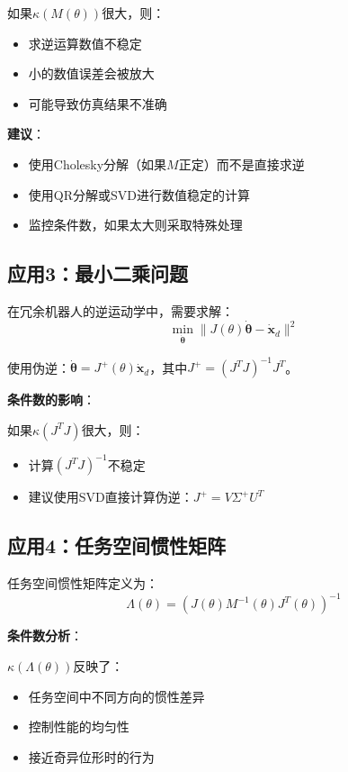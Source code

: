\documentclass[12pt,a4paper]{article}
\begin{document}
如果$\kappa(M(\theta))$很大，则：
\begin{itemize}
\item 求逆运算数值不稳定
\item 小的数值误差会被放大
\item 可能导致仿真结果不准确
\end{itemize}

\textbf{建议}：
\begin{itemize}
\item 使用Cholesky分解（如果$M$正定）而不是直接求逆
\item 使用QR分解或SVD进行数值稳定的计算
\item 监控条件数，如果太大则采取特殊处理
\end{itemize}

\subsection{应用3：最小二乘问题}

在冗余机器人的逆运动学中，需要求解：
\begin{equation}
\min_{\dot{\bm{\theta}}} \|J(\theta)\dot{\bm{\theta}} - \dot{\bm{x}}_d\|^2
\end{equation}

使用伪逆：$\dot{\bm{\theta}} = J^+(\theta) \dot{\bm{x}}_d$，其中$J^+ = (J^T J)^{-1} J^T$。

\textbf{条件数的影响}：

如果$\kappa(J^T J)$很大，则：
\begin{itemize}
\item 计算$(J^T J)^{-1}$不稳定
\item 建议使用SVD直接计算伪逆：$J^+ = V\Sigma^+ U^T$
\end{itemize}

\subsection{应用4：任务空间惯性矩阵}

任务空间惯性矩阵定义为：
\begin{equation}
\Lambda(\theta) = (J(\theta) M^{-1}(\theta) J^T(\theta))^{-1}
\end{equation}

\textbf{条件数分析}：

$\kappa(\Lambda(\theta))$反映了：
\begin{itemize}
\item 任务空间中不同方向的惯性差异
\item 控制性能的均匀性
\item 接近奇异位形时的行为
\end{itemize}
\end{document}
